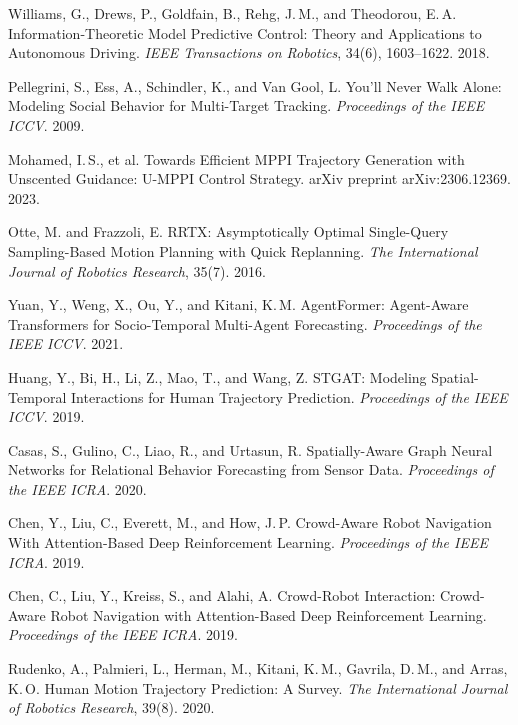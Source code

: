 \documentclass[12pt, a4paper]{article}
\begin{document}
\begin{enumerate}[label={[\arabic*]}, leftmargin=*, itemsep=4pt]
\item Williams, G., Drews, P., Goldfain, B., Rehg, J.\,M., and Theodorou, E.\,A. Information-Theoretic Model Predictive Control: Theory and Applications to Autonomous Driving. \textit{IEEE Transactions on Robotics}, 34(6), 1603--1622. 2018.

\item Pellegrini, S., Ess, A., Schindler, K., and Van Gool, L. You'll Never Walk Alone: Modeling Social Behavior for Multi-Target Tracking. \textit{Proceedings of the IEEE ICCV}. 2009.

\item Mohamed, I.\,S., et al. Towards Efficient MPPI Trajectory Generation with Unscented Guidance: U-MPPI Control Strategy. arXiv preprint arXiv:2306.12369. 2023.

\item Otte, M. and Frazzoli, E. RRTX: Asymptotically Optimal Single-Query Sampling-Based Motion Planning with Quick Replanning. \textit{The International Journal of Robotics Research}, 35(7). 2016.

\item Yuan, Y., Weng, X., Ou, Y., and Kitani, K.\,M. AgentFormer: Agent-Aware Transformers for Socio-Temporal Multi-Agent Forecasting. \textit{Proceedings of the IEEE ICCV}. 2021.

\item Huang, Y., Bi, H., Li, Z., Mao, T., and Wang, Z. STGAT: Modeling Spatial-Temporal Interactions for Human Trajectory Prediction. \textit{Proceedings of the IEEE ICCV}. 2019.

\item Casas, S., Gulino, C., Liao, R., and Urtasun, R. Spatially-Aware Graph Neural Networks for Relational Behavior Forecasting from Sensor Data. \textit{Proceedings of the IEEE ICRA}. 2020.

\item Chen, Y., Liu, C., Everett, M., and How, J.\,P. Crowd-Aware Robot Navigation With Attention-Based Deep Reinforcement Learning. \textit{Proceedings of the IEEE ICRA}. 2019.

\item Chen, C., Liu, Y., Kreiss, S., and Alahi, A. Crowd-Robot Interaction: Crowd-Aware Robot Navigation with Attention-Based Deep Reinforcement Learning. \textit{Proceedings of the IEEE ICRA}. 2019.

\item Rudenko, A., Palmieri, L., Herman, M., Kitani, K.\,M., Gavrila, D.\,M., and Arras, K.\,O. Human Motion Trajectory Prediction: A Survey. \textit{The International Journal of Robotics Research}, 39(8). 2020.


\end{enumerate}
\end{document}
